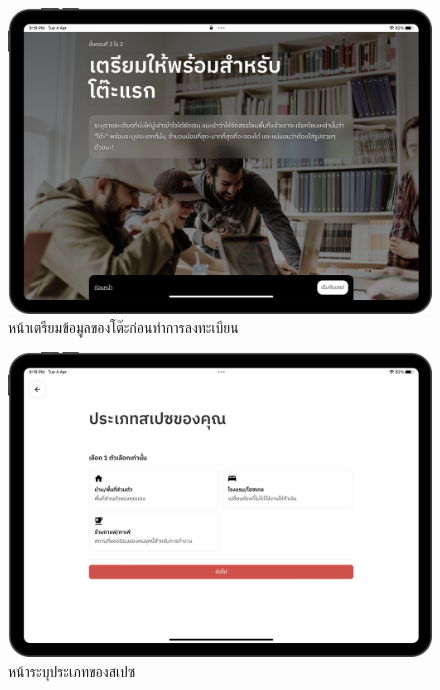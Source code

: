 \begin{figure}[ht]
    \begin{center}
    \includegraphics[width=5.5in]{./image/Flowider_onboarding_2.png}
    \end{center}
    \caption[Flowider onboarding 2]{หน้าเตรียมข้อมูลของโต๊ะก่อนทำการลงทะเบียน}
    \label{fig:Flowider_onboarding_2}
\end{figure}
\begin{figure}[ht]
    \begin{center}
    \includegraphics[width=5.5in]{./image/Flowider_place_category.png}
    \end{center}
    \caption[Flowider place category]{หน้าระบุประเภทของสเปซ}
    \label{fig:Flowider_place_category}
\end{figure}
